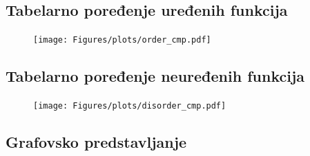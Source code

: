 \documentclass{beamer}
\begin{document}
\subsection{Tabelarno poređenje uređenih funkcija}



\begin{frame}
  \begin{figure}[th]
    \vspace*{-0.8cm}
    \hspace*{-0.45cm}
    \texttt{[image: Figures/plots/order\_cmp.pdf]}
  \end{figure}
\end{frame}

\subsection{Tabelarno poređenje neuređenih funkcija}
\begin{frame}
  \begin{figure}[th]
    \vspace*{-0.8cm}
    \hspace*{-0.45cm}
    \texttt{[image: Figures/plots/disorder\_cmp.pdf]}
  \end{figure}
\end{frame}




\subsection{Grafovsko predstavljanje}
\end{document}
